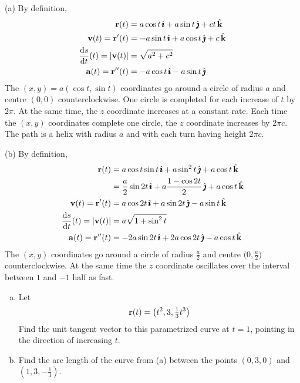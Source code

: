 \begin{solution}
(a) By definition,
\begin{align*}
\vr(t)&= a \cos t\,\hi+a\sin t\,\hj+ct\,\hk\\
\vv(t)=\vr'(t)&= -a \sin t\,\hi+a\cos t\,\hj+c\,\hk\\
\diff{s}{t}(t)=|\vv(t)|&= \sqrt{a^2+c^2}\\
\va(t)=\vr''(t)&= -a \cos t\,\hi-a\sin t\,\hj
\end{align*}
The $(x,y)= a(\cos t,\sin t)$ coordinates go 
     around a circle of radius $a$ and centre $(0,0)$ counterclockwise.
     One circle is completed for each increase of $t$ by $2\pi$.
     At the same time, the $z$ coordinate increases at a constant rate. 
     Each time the $(x,y)$ coordinates complete one circle, the $z$ 
     coordinate increases by $2 \pi c$.
The path is a helix with radius $a$ and with each turn having height $2\pi c$.

(b) By definition,
\begin{align*}
\vr(t)&= a \cos t\sin t\,\hi +a\sin^2 t\,\hj+a\cos t\,\hk\\
      &= \frac{a}{2} \sin 2t\,\hi+a\frac{1-\cos 2t}{2}\,\hj+a\cos t\,\hk\\
\vv(t)=\vr'(t)&= a \cos 2t\,\hi +a\sin 2t\,\hj-a\sin t\,\hk\\
\diff{s}{t}(t)=|\vv(t)|&= a\sqrt{1+\sin^2t}\\
\va(t)=\vr''(t)&= -2a \sin 2t\,\hi +2a\cos 2t\,\hj-a\cos t\,\hk
\end{align*}
The $(x,y)$ coordinates go around a circle of radius $\frac{a}{2}$ and
centre $\big(0,\frac{a}{2}\big)$ counterclockwise. At the same time the $z$ coordinate oscillates over the interval between $1$ and $-1$ half as fast.
\end{solution}

\begin{question}[M317 2013D] %

\begin{enumerate}[(a)]
\item
Let
\begin{equation*}
\mathbf{r}(t) = \left(t^2 , 3, \tfrac{1}{3} t^3 \right) 
\end{equation*}
Find the unit tangent vector to this parametrized curve at $t = 1$, 
pointing in the direction of increasing $t$.
\item
Find the arc length of the curve from (a) between the points $(0, 3, 0)$ 
and $(1, 3, -\frac{1}{3})$.

\end{enumerate}
\end{question}

